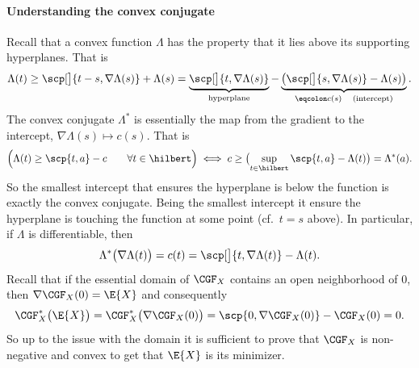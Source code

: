 \paragraph*{Understanding the convex conjugate} Recall that a convex function
\(\Lambda\) has the property that it lies above its supporting hyperplanes. That is 
\[
    \Lambda(t) \ge \scp[\big]{t-s, \nabla \Lambda(s)} + \Lambda(s)
    = \underbrace{\scp[\big]{t, \nabla \Lambda(s)}}_{\text{hyperplane}}
    - \underbrace{\bigl(\scp[\big]{s, \nabla \Lambda(s)} - \Lambda(s)\bigr)}_{\eqcolon c(s) \quad\text{(intercept)}}.
\]
The convex conjugate \(\Lambda^*\) is essentially the map from the gradient to
the intercept, \(\nabla \Lambda(s) \mapsto c(s)\). That is
\[
    \Bigl(\Lambda(t) \ge \scp{t, a} - c\qquad \forall t \in \hilbert\Bigr)
    \iff c \ge \bigl(\sup_{t \in \hilbert} \scp{t, a} - \Lambda(t)\bigr) = \Lambda^*(a).
\]
So the smallest intercept that ensures the hyperplane is below the function is
exactly the convex conjugate. Being the smallest intercept it ensure the hyperplane
is touching the function at some point (cf.~\(t=s\) above). In particular,
if \(\Lambda\) is differentiable, then
\begin{equation}
    \label{eq: gradient of cgf star}    
    \Lambda^*\bigl(\nabla\Lambda(t)\bigr)
    = c(t)
    = \scp[\big]{t, \nabla \Lambda(t)} - \Lambda(t).
\end{equation}
Recall that if the essential domain of \(\CGF_X\) contains an open
neighborhood of \(0\), then \(\nabla \CGF_X(0) = \E{X}\) and consequently
\begin{equation}
    \label{eq: cgf star at expected value}    
    \CGF_X^*\bigl(\E{X}\bigr) = \CGF_X^*\bigl(\nabla \CGF_X(0)\bigr) = \scp{0, \nabla \CGF_X(0)} - \CGF_X(0) = 0.
\end{equation}
So up to the issue with the domain it is sufficient to prove that \(\CGF_X\)
is non-negative and convex to get that \(\E{X}\) is its minimizer.


